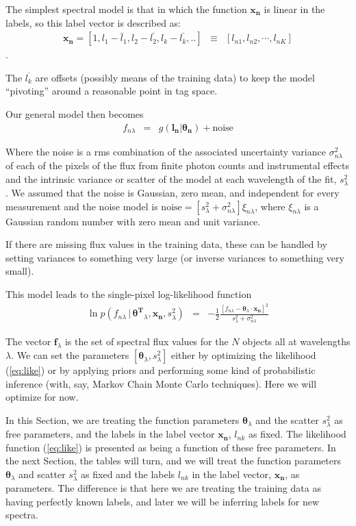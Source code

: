 \documentclass[12pt, preprint]{aastex}
\newcommand{\sectionname}{Section}
\newcommand{\set}[1]{\bm{#1}}
\newcommand{\mean}[1]{\overline{#1}}
\newcommand{\given}{\,|\,}
\begin{document}
The simplest spectral model is that in which the function $\boldsymbol{x_n}$ is
linear in the labels, so this label vector is described as:
\begin{eqnarray}
\set{x_n} =  [1, l_1 - \bar{l}_1, l_2 - \bar{l_2}, l_k - \bar{l_k}, .. ] &\equiv& [l_{n1}, l_{n2}, \cdots, l_{nK}]
\label{eq:linear}
\end{eqnarray}.

The $\mean{l_k}$ are offsets (possibly means of the training data) to keep the model ``pivoting'' around a reasonable point in tag space.


Our general model then becomes
\begin{eqnarray}
f_{n\lambda} &=&
g(\boldsymbol{l_n} |  \boldsymbol{\theta_n}) + \mbox{noise}
\end{eqnarray}

Where the noise is a rms combination of the associated uncertainty variance
$\sigma_{n\lambda}^2$ of each of the pixels of the flux from finite photon counts and instrumental effects and the intrinsic variance or scatter of the model at each wavelength of the fit, $s_\lambda^2$. We assumed that the noise is Gaussian, zero mean, and independent for every measurement and the noise model is $\mbox{noise} = [s_\lambda^2+ \sigma_{n\lambda}^2]\xi_{n\lambda}$, where $\xi_{n\lambda}$ is a Gaussian random number with zero mean and unit
variance.

If there are missing flux values in the training data, these can be
handled by setting variances to something very large (or inverse
variances to something very small).

This model leads to the single-pixel log-likelihood function 
\begin{eqnarray}
\ln p(f_{n\lambda}\given\set{\theta^T}_\lambda, \boldsymbol{x_n}, s_\lambda^2) &=&
 -\frac{1}{2}\frac{[f_{n\lambda} - \set{\theta}_\lambda \cdot \set{x_n}]^2}{s_\lambda^2 + \sigma_{n\lambda}^2}
\label{eq:like}
\end{eqnarray}


The vector $\set{f}_\lambda$ is the set of spectral flux values for
the $N$ objects all at wavelengths $\lambda$.
We can set the parameters $[\set{\theta}_\lambda,s_\lambda^2]$ either by
optimizing the likelihood (\ref{eq:like}) or by applying priors and
performing some kind of probabilistic inference (with, say, Markov
Chain Monte Carlo techniques).
Here we will optimize for now.

In this \sectionname, we are treating the function parameters
$\set{\theta}_\lambda$ and the scatter $s_\lambda^2$ as free parameters, and the
labels in the label vector $\set{x_n}$, $l_{nk}$ as fixed.
The likelihood function (\ref{eq:like}) is presented as being a
function of these free parameters.
In the next \sectionname, the tables will turn, and we will treat the
function parameters $\set{\theta}_\lambda$ and scatter $s_{\lambda}^2$ as fixed and
the labels $l_{nk}$ in the label vector, $\set{x_n}$, as parameters.
The difference is that here we are treating the training data as
having perfectly known labels, and later we will be inferring labels for
new spectra.
\end{document}
